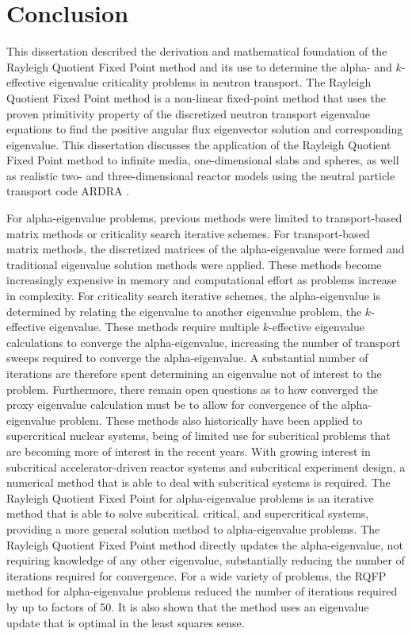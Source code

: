 \chapter{Conclusion}
\label{ch:Conc}

This dissertation described the derivation and mathematical foundation of the Rayleigh Quotient Fixed Point method and its use to determine the alpha- and $k$-effective eigenvalue criticality problems in neutron transport. The Rayleigh Quotient Fixed Point method is a non-linear fixed-point method that uses the proven primitivity property of the discretized neutron transport eigenvalue equations to find the positive angular flux eigenvector solution and corresponding eigenvalue. This dissertation discusses the application of the Rayleigh Quotient Fixed Point method to infinite media, one-dimensional slabs and spheres, as well as realistic two- and three-dimensional reactor models using the neutral particle transport code ARDRA \cite{hanebutte_ardra_1999}.

For alpha-eigenvalue problems, previous methods were limited to transport-based matrix methods or criticality search iterative schemes. For transport-based matrix methods, the discretized matrices of the alpha-eigenvalue were formed and traditional eigenvalue solution methods were applied. These methods become increasingly expensive in memory and computational effort as problems increase in complexity. For criticality search iterative schemes, the alpha-eigenvalue is determined by relating the eigenvalue to another eigenvalue problem, the $k$-effective eigenvalue. These methods require multiple $k$-effective eigenvalue calculations to converge the alpha-eigenvalue, increasing the number of transport sweeps required to converge the alpha-eigenvalue. A substantial number of iterations are therefore spent determining an eigenvalue not of interest to the problem. Furthermore, there remain open questions as to how converged the proxy eigenvalue calculation must be to allow for convergence of the alpha-eigenvalue problem. These methods also historically have been applied to supercritical nuclear systems, being of limited use for subcritical problems that are becoming more of interest in  the recent years. With growing interest in subcritical accelerator-driven reactor systems and subcritical experiment design, a numerical method that is able to deal with subcritical systems is required. The Rayleigh Quotient Fixed Point for alpha-eigenvalue problems is an iterative method that is able to solve subcritical. critical, and supercritical systems, providing a more general solution method to alpha-eigenvalue problems. The Rayleigh Quotient Fixed Point method directly updates the alpha-eigenvalue, not requiring knowledge of any other eigenvalue, substantially reducing the number of iterations required for convergence. For a wide variety of problems, the RQFP method for alpha-eigenvalue problems reduced the number of iterations required by up to factors of 50. It is also shown that the method uses an eigenvalue update that is optimal in the least squares sense.

